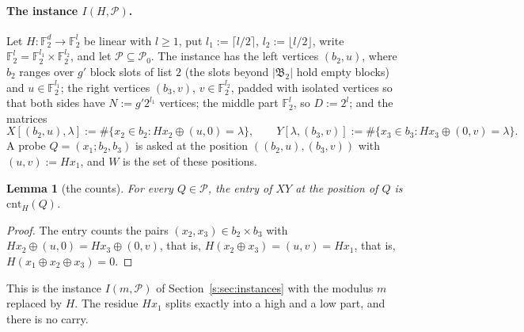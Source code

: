 \documentclass[11pt]{article}
\newtheorem{lemma}[theorem]{Lemma}
\theoremstyle{definition}
\theoremstyle{remark}
\newcommand{\F}{\mathbb{F}_2}
\newcommand{\cnt}{\mathrm{cnt}}
\newcommand{\Pq}{\mathcal{P}}
\begin{document}
\paragraph{The instance $I(H,\Pq)$.} Let $H\colon\F^d\to\F^l$ be linear with $l\ge1$, put $l_1:=\lceil l/2\rceil$, $l_2:=\lfloor l/2\rfloor$, write $\F^l=\F^{l_1}\times\F^{l_2}$, and let $\Pq\subseteq\Pq_0$. The instance has the left vertices $(b_2,u)$, where $b_2$ ranges over $g'$ block slots of list $2$ (the slots beyond $|\mathfrak B_2|$ hold empty blocks) and $u\in\F^{l_1}$; the right vertices $(b_3,v)$, $v\in\F^{l_2}$, padded with isolated vertices so that both sides have $N:=g'2^{l_1}$ vertices; the middle part $\F^l$, so $D:=2^l$; and the matrices
\[
X[(b_2,u),\lambda]:=\#\{x_2\in b_2:Hx_2\oplus(u,0)=\lambda\},\qquad Y[\lambda,(b_3,v)]:=\#\{x_3\in b_3:Hx_3\oplus(0,v)=\lambda\}.
\]
A probe $Q=(x_1;b_2,b_3)$ is asked at the position $((b_2,u),(b_3,v))$ with $(u,v):=Hx_1$, and $W$ is the set of these positions.

\begin{lemma}[the counts]\label{x:lem:counts}
For every $Q\in\Pq$, the entry of $XY$ at the position of $Q$ is $\cnt_H(Q)$.
\end{lemma}
\begin{proof}
The entry counts the pairs $(x_2,x_3)\in b_2\times b_3$ with $Hx_2\oplus(u,0)=Hx_3\oplus(0,v)$, that is, $H(x_2\oplus x_3)=(u,v)=Hx_1$, that is, $H(x_1\oplus x_2\oplus x_3)=0$.
\end{proof}

This is the instance $I(m,\Pq)$ of Section~\ref{s:sec:instances} with the modulus $m$ replaced by $H$. The residue $Hx_1$ splits exactly into a high and a low part, and there is no carry.
\end{document}
